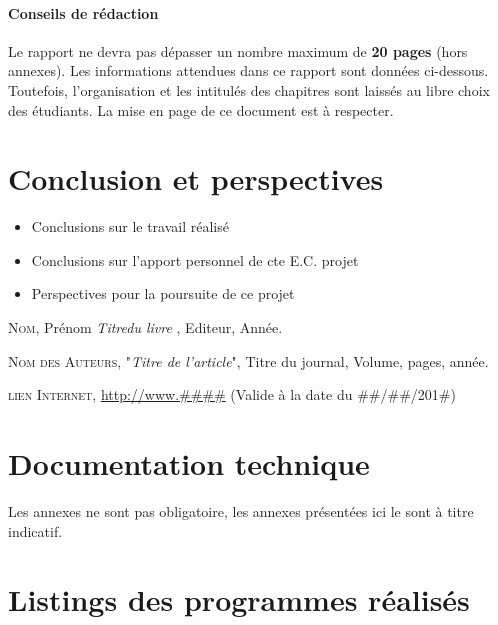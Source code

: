 \documentclass[a4paper, 12pt]{report} %
\begin{document}
				\subsubsection{Conseils de rédaction}

	Le rapport ne devra pas dépasser un nombre maximum de \textbf{20 pages} (hors annexes). Les informations attendues dans ce rapport sont données ci-dessous. Toutefois, l’organisation et les intitulés des chapitres sont laissés au libre choix des étudiants. La mise en page de ce document est à respecter. 

	\chapter*{Conclusion et perspectives}		%
\begin{itemize}
\item Conclusions sur le travail réalisé
\item Conclusions sur l’apport personnel de cte E.C. projet
\item Perspectives pour la poursuite de ce projet
\end{itemize}

\begin{thebibliography}{9}

		\textsc{Nom}, Prénom
		\textit{Titredu livre },
		Editeur, Année.

		\textsc{Nom des Auteurs},
		"\textit{Titre de l'article}",
		Titre du journal,
		Volume, pages, année.

\textsc{lien Internet},
		\url{http://www.\#\#\#\#}
		(Valide à la date du \#\#/\#\#/201\#)

\end{thebibliography}

\appendix

	\chapter{Documentation technique}

Les annexes ne sont pas obligatoire, les annexes présentées ici le sont à titre indicatif.
	\chapter{Listings des programmes réalisés}
\end{document}
